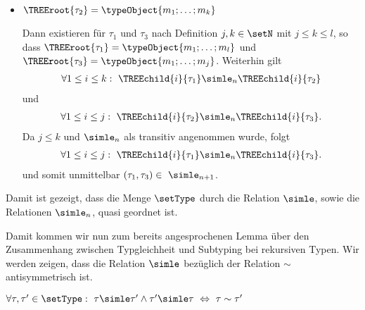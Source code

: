 \begin{beweis}
\begin{itemize}
            \item $\TREEroot{\tau_2} = \typeObject{m_1;\ldots;m_k}$
            
                  Dann existieren f\"ur $\tau_1$ und $\tau_3$ nach Definition $j,k\in\setN$ mit $j \le k \le l$, so dass
                  $\TREEroot{\tau_1} = \typeObject{m_1;\ldots;m_l}$ und $\TREEroot{\tau_3} = \typeObject{m_1;\ldots;m_j}$.
                  Weiterhin gilt
                  \[\begin{array}{l}
                    \forall 1 \le i \le k:\ \TREEchild{i}{\tau_1} \simle_n \TREEchild{i}{\tau_2}
                  \end{array}\]
                  und
                  \[\begin{array}{l}
                    \forall 1 \le i \le j:\ \TREEchild{i}{\tau_2} \simle_n \TREEchild{i}{\tau_3}.
                  \end{array}\]
                  Da $j \le k$ und $\simle_n$ als transitiv angenommen wurde, folgt
                  \[\begin{array}{l}
                    \forall 1 \le i \le j:\ \TREEchild{i}{\tau_1} \simle_n \TREEchild{i}{\tau_3}.
                  \end{array}\]
                  und somit unmittelbar $(\tau_1,\tau_3)\in\ \simle_{n+1}$.
          \PROOFCASEend
  \end{itemize}
  Damit ist gezeigt, dass die Menge $\setType$ durch die Relation $\simle$, sowie die Relationen $\simle_n$, quasi geordnet ist.
\end{beweis}

Damit kommen wir nun zum bereits angesprochenen Lemma \"uber den Zusammenhang zwischen Typgleichheit und Subtyping bei
rekursiven Typen. Wir werden zeigen, dass die Relation $\simle$ bez\"uglich der Relation $\sim$ antisymmetrisch ist.

\begin{lemma} \label{lemma:Losrt:Antisymmetrie}
  $\forall \tau,\tau'\in\setType:\ \tau \simle \tau' \wedge \tau' \simle \tau\ \Leftrightarrow\ \tau\sim\tau'$
\end{lemma}

